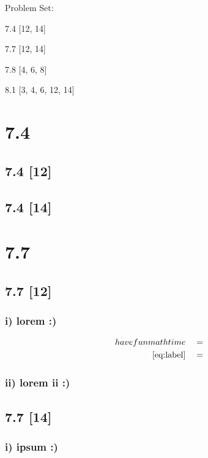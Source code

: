 \documentclass{article}
\begin{document}
{\large \noindent Problem Set:}

\par 7.4 [12, 14]
\par 7.7 [12, 14]
\par 7.8 [4, 6, 8]
\par 8.1 [3, 4, 6, 12, 14]
\vspace{5mm}

\noindent \hrulefill

\section*{7.4}
\setcounter{equation}{0}

\subsection*{7.4 [12]}
\subsection*{7.4 [14]}

\newpage

\section*{7.7}
\setcounter{equation}{0}

\subsection*{7.7 [12]}

\subsubsection*{i) lorem :)}

\begin{align}
    \label{eq:label}
    have fun math time && &=
    \\
    \label{eq:label2}
    \eqref{eq:label} && &=
\end{align}
\subsubsection*{ii) lorem ii :)}

\subsection*{7.7 [14]}

\subsubsection*{i) ipsum :)}
\end{document}
